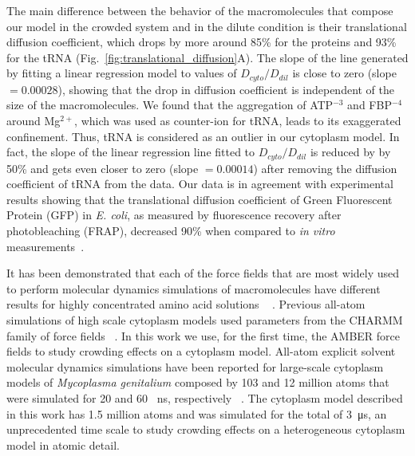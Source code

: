 \documentclass[journal=jacsat,manuscript=article]{achemso}
\begin{document}
The main difference between the behavior of the macromolecules that compose our model in the crowded system and in the dilute condition is their translational diffusion coefficient, which drops by more around 85\% for the proteins and 93\% for the tRNA (Fig.~\ref{fig:translational_diffusion}A). The slope of the line generated by fitting a linear regression model to values of $D_{cyto}/D_{dil}$ is close to zero (slope $= 0.00028$), showing that the drop in diffusion coefficient is independent of the size of the macromolecules. We found that the aggregation of ATP$^{-3}$ and FBP$^{-4}$ around Mg$^{2+}$, which was used as counter-ion for tRNA, leads to its exaggerated confinement. Thus, tRNA is considered as an outlier in our cytoplasm model. In fact, the slope of the linear regression line fitted to $D_{cyto}/D_{dil}$ is reduced by by 50\% and gets even closer to zero (slope $= 0.00014$) after removing the diffusion coefficient of tRNA from the data. Our data is in agreement with experimental results showing that the translational diffusion coefficient of Green Fluorescent Protein (GFP) in {\em E. coli}, as measured by fluorescence recovery after photobleaching (FRAP), decreased 90\% when compared to {\em in vitro} measurements~\cite{Elowitz1999,Konopka2006}.


It has been demonstrated that each of the force fields that are most widely used to perform molecular dynamics simulations of macromolecules have different results for highly concentrated amino acid solutions ~ \cite{andrews2013molecular}. Previous all-atom simulations of high scale cytoplasm models used parameters from the CHARMM family of force fields ~\cite{yu2016biomolecular,mcguffee2010diffusion}. In this work we use, for the first time, the AMBER force fields to study crowding effects on a cytoplasm model. All-atom explicit solvent molecular dynamics simulations have been reported for large-scale cytoplasm models of \textit{Mycoplasma genitalium} composed by 103 and 12 million atoms that were simulated for 20 and 60 \SI{}{\nano\second}, respectively ~\cite{yu2016biomolecular}. The cytoplasm model described in this work has 1.5 million atoms and was simulated for the total of \SI{3}{\micro\second}, an unprecedented time scale to study crowding effects on a heterogeneous cytoplasm model in atomic detail.
\end{document}

